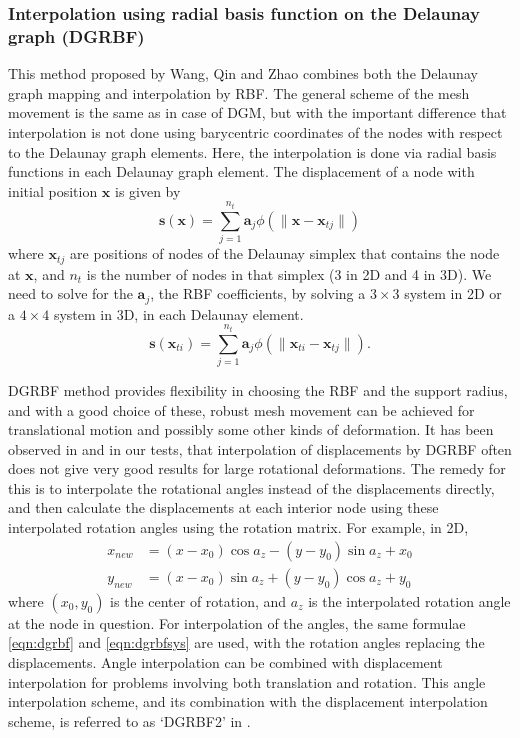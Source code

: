 \documentclass[letterpaper,11pt]{article}
\let\bld\boldsymbol
\begin{document}
\subsubsection[DG-RBF]{Interpolation using radial basis function on the Delaunay graph (DGRBF)}
This method proposed by Wang, Qin and Zhao \cite{mm:dgrbf} combines both the Delaunay graph mapping and interpolation by RBF. The general scheme of the mesh movement is the same as in case of DGM, but with the important difference that interpolation is not done using barycentric coordinates of the nodes with respect to the Delaunay graph elements. Here, the interpolation is done via radial basis functions in each Delaunay graph element. The displacement of a node with initial position $\bld{x}$ is given by
\begin{equation}
\mathbf{s}(\mathbf{x}) = \sum_{j=1}^{n_t} \mathbf{a}_j \phi(\lVert\mathbf{x} - \mathbf{x}_{tj}\rVert)
\label{eqn:dgrbf}
\end{equation}
where $\bld{x}_{tj}$ are positions of nodes of the Delaunay simplex that contains the node at $\bld{x}$, and $n_t$ is the number of nodes in that simplex (3 in 2D and 4 in 3D). We need to solve for the $\bld{a}_j$, the RBF coefficients, by solving a $3 \times 3$ system in 2D or a $4 \times 4$ system in 3D, in each Delaunay element.
\begin{equation}
\mathbf{s}(\mathbf{x}_{ti}) = \sum_{j=1}^{n_t} \mathbf{a}_j \phi(\lVert\mathbf{x}_{ti} - \mathbf{x}_{tj}\rVert).
\label{eqn:dgrbfsys}
\end{equation}

DGRBF method provides flexibility in choosing the RBF and the support radius, and with a good choice of these, robust mesh movement can be achieved for translational motion and possibly some other kinds of deformation. It has been observed in \cite{mm:dgrbf} and in our tests, that interpolation of displacements by DGRBF often does not give very good results for large rotational deformations. The remedy for this is to interpolate the rotational angles instead of the displacements directly, and then calculate the displacements at each interior node using these interpolated rotation angles using the rotation matrix. For example, in 2D,
\begin{align}
x_{new} &= (x-x_0)\cos a_z - (y-y_0)\sin a_z + x_0 \\
y_{new} &= (x-x_0)\sin a_z + (y-y_0)\cos a_z + y_0
\end{align}
where $(x_0,y_0)$ is the center of rotation, and $a_z$ is the interpolated rotation angle at the node in question. For interpolation of the angles, the same formulae \eqref{eqn:dgrbf} and \eqref{eqn:dgrbfsys} are used, with the rotation angles replacing the displacements. Angle interpolation can be combined with displacement interpolation for problems involving both translation and rotation. This angle interpolation scheme, and its combination with the displacement interpolation scheme, is referred to as `DGRBF2' in \cite{mm:dgrbf}.
\end{document}
